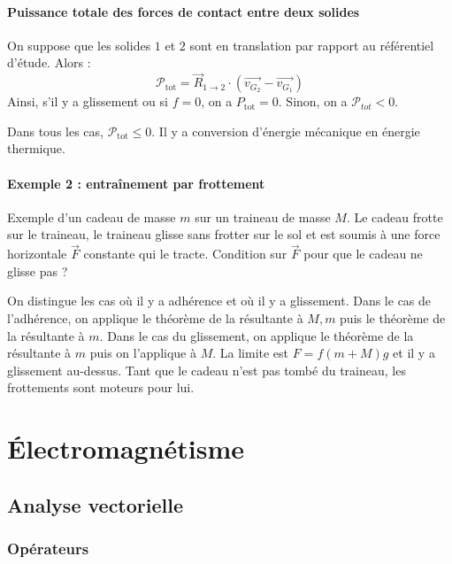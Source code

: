 \documentclass[french]{book}
\theoremstyle{plain}
\theoremstyle{definition}
\theoremstyle{remark}
\begin{document}
\subsection{Puissance totale des forces de contact entre deux solides}
On suppose que les solides $1$ et $2$ sont en translation par rapport au référentiel d'étude. Alors : $$\mathcal{P}_{\text{tot}}=\overrightarrow{R}_{1\to 2}\cdot\left(\overrightarrow{v_{G_2}}-\overrightarrow{v_{G_1}}\right)$$ Ainsi, s'il y a glissement ou si $f=0$, on a $P_{\text{tot}}=0$. Sinon, on a $\mathcal{P}_{tot}<0$. \\ \par Dans tous les cas, $\mathcal{P}_{\text{tot}}\leqslant0$. Il y a conversion d'énergie mécanique en énergie thermique.
\subsection{Exemple 2 : entraînement par frottement}
Exemple d'un cadeau de masse $m$ sur un traineau de masse $M$. Le cadeau frotte sur le traineau, le traineau glisse sans frotter sur le sol et est soumis à une force horizontale $\overrightarrow{F}$ constante qui le tracte. Condition sur $\overrightarrow{F}$ pour que le cadeau ne glisse pas ? \\ \par On distingue les cas où il y a adhérence et où il y a glissement. Dans le cas de l'adhérence, on applique le théorème de la résultante à ${M,m}$ puis le théorème de la résultante à ${m}$. Dans le cas du glissement, on applique le théorème de la résultante à ${m}$ puis on l'applique à ${M}$. La limite est $F=f(m+M)g$ et il y a glissement au-dessus. Tant que le cadeau n'est pas tombé du traineau, les frottements sont moteurs pour lui. 

\part{Électromagnétisme}

\chapter{Analyse vectorielle}
\localtableofcontents
\section{Opérateurs}
\end{document}
